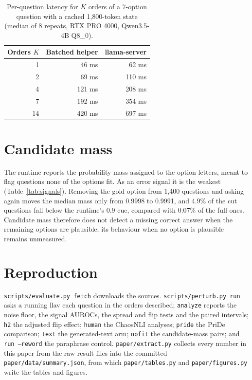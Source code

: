 \documentclass[10pt,twocolumn]{article}
\begin{document}
\begin{table}[t]
\centering\small
\begin{tabular}{@{}rrr@{}}
\toprule
Orders $K$ & Batched helper & llama-server \\
\midrule
1 & 46 ms & 62 ms \\
2 & 69 ms & 110 ms \\
4 & 121 ms & 208 ms \\
7 & 192 ms & 354 ms \\
14 & 420 ms & 697 ms \\
\bottomrule
\end{tabular}
\caption{Per-question latency for $K$ orders of a 7-option question with a cached 1,800-token state (median of 8 repeats, RTX PRO 4000, Qwen3.5-4B Q8\_0).}
\label{tab:cost}
\end{table}

\section{Candidate mass}
\label{app:mass}
The runtime reports the probability mass assigned to the option letters, meant to flag questions none of the options fit. As an error signal it is the weakest (Table~\ref{tab:signals}). Removing the gold option from 1,400 questions and asking again moves the median mass only from 0.9998 to 0.9991, and 4.9\% of the cut questions fall below the runtime's 0.9 cue, compared with 0.07\% of the full ones. Candidate mass therefore does not detect a missing correct answer when the remaining options are plausible; its behaviour when no option is plausible remains unmeasured.

\section{Reproduction}
\label{app:repro}
\texttt{scripts/evaluate.py fetch} downloads the sources. \texttt{scripts/perturb.py run} asks a running llav each question in the orders described; \texttt{analyze} reports the noise floor, the signal AUROCs, the spread and flip tests and the paired intervals; \texttt{h2} the adjusted flip effect; \texttt{human} the ChaosNLI analyses; \texttt{pride} the PriDe comparison; \texttt{text} the generated-text arm; \texttt{nofit} the candidate-mass pairs; and \texttt{run --reword} the paraphrase control. \texttt{paper/extract.py} collects every number in this paper from the raw result files into the committed \texttt{paper/data/summary.json}, from which \texttt{paper/tables.py} and \texttt{paper/figures.py} write the tables and figures.
\end{document}
